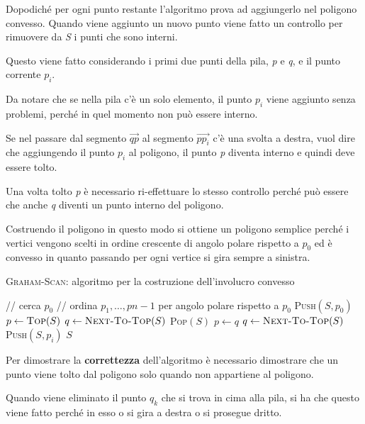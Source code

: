 Dopodiché per ogni punto restante l'algoritmo prova ad aggiungerlo nel poligono convesso. 
Quando viene aggiunto un nuovo punto viene fatto un controllo per rimuovere da \emph{S} i punti che sono interni.

Questo viene fatto considerando i primi due punti della pila, \emph{p} e \emph{q}, e il punto corrente $p_i$.

Da notare che se nella pila c'è un solo elemento, il punto $p_i$ viene aggiunto senza problemi, perché in quel momento non può essere interno.

Se nel passare dal segmento $\overrightarrow{qp}$ al segmento $\overrightarrow{pp_i}$ c'è una svolta a destra, vuol dire che aggiungendo il punto $p_i$ al poligono, il punto \emph{p} diventa interno e quindi deve essere tolto.

Una volta tolto \emph{p} è necessario ri-effettuare lo stesso controllo perché può essere che anche \emph{q} diventi un punto interno del poligono.

Costruendo il poligono in questo modo si ottiene un poligono semplice perché i vertici vengono scelti in ordine crescente di angolo polare rispetto a $ p_0 $ ed è convesso in quanto passando per ogni vertice si gira sempre a sinistra.

\begin{breakablealgorithm}
	\caption{\textsc{Graham-Scan}: algoritmo per la costruzione dell'involucro convesso}
	\begin{algorithmic}[1]
		\State // cerca $p_0$
		\State // ordina $p_1, \ldots, p{n-1}$ per angolo polare rispetto a $p_0$
		\State \textsc{Push}$(S,p_0)$
		    \State $p \gets \textsc{Top}(S)$
		    \State $q \gets \textsc{Next-To-Top}(S)$
		        \State \textsc{Pop}$(S)$
		        \State $p \gets q$
		        \State $q \gets \textsc{Next-To-Top}(S)$
		     \EndWhile
		     \State \textsc{Push}$(S,p_i)$
		\EndFor
		\State \Return $S$
		\EndFunction
   	\end{algorithmic}
\end{breakablealgorithm}

Per dimostrare la \textbf{correttezza} dell'algoritmo è necessario dimostrare che un punto viene tolto dal poligono solo quando non appartiene al poligono.

Quando viene eliminato il punto $ q_k $ che si trova in cima alla pila, si ha che questo viene fatto perché in esso o si gira a destra o si prosegue dritto.

